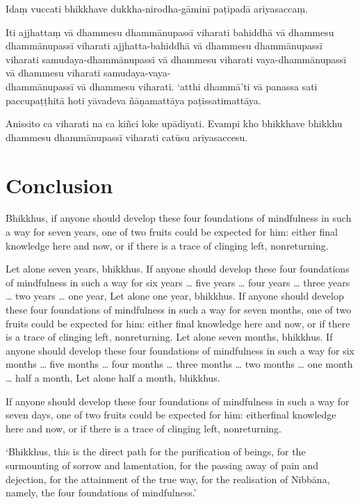 Idaṃ vuccati bhikkhave dukkha-nirodha-gāminī paṭipadā ariyasaccaṃ.

Iti ajjhattaṃ vā dhammesu dhammānupassī viharati bahiddhā vā dhammesu
dhammānupassī viharati ajjhatta-bahiddhā vā dhammesu dhammānupassī viharati
samudaya-dhammānupassī vā dhammesu viharati vaya-dhammānupassī vā dhammesu
viharati samudaya-vaya-\\
dhammānupassī vā dhammesu viharati. `atthi dhammā'ti vā
panassa sati paccupaṭṭhitā hoti yāvadeva ñāṇamattāya paṭissatimattāya.

Anissito ca viharati na ca kiñci loke upādiyati. Evampi kho bhikkhave bhikkhu
dhammesu dhammānupassī viharati catūsu ariyasaccesu.



\englishPage
\chapter{Conclusion}

Bhikkhus, if anyone should develop these four foundations of mindfulness in
such a way for seven years, one of two fruits could be expected for him: either
final knowledge here and now, or if there is a trace of clinging left,
nonreturning.

Let alone seven years, bhikkhus. If anyone should develop these four
foundations of mindfulness in such a way for six years \ldots{} five years
\ldots{} four years \ldots{} three years \ldots{} two years \ldots{} one year,
Let alone one year, bhikkhus. If anyone should develop these four foundations
of mindfulness in such a way for seven months, one of two fruits could be
expected for him: either final knowledge here and now, or if there is a trace of
clinging left, nonreturning. Let alone seven months, bhikkhus. If anyone should
develop these four foundations of mindfulness in such a way for six months
\ldots{} five months \ldots{} four months \ldots{} three months \ldots{} two
months \ldots{} one month \ldots{} half a month, Let alone half a month,
bhikkhus.

If anyone should develop these four foundations of mindfulness in such a way
for seven days, one of two fruits could be expected for him: eitherfinal
knowledge here and now, or if there is a trace of clinging left, nonreturning.

`Bhikkhus, this is the direct path for the purification of beings, for the
surmounting of sorrow and lamentation, for the passing away of pain and
dejection, for the attainment of the true way, for the realisation of Nibbāna,
namely, the four foundations of mindfulness.'

